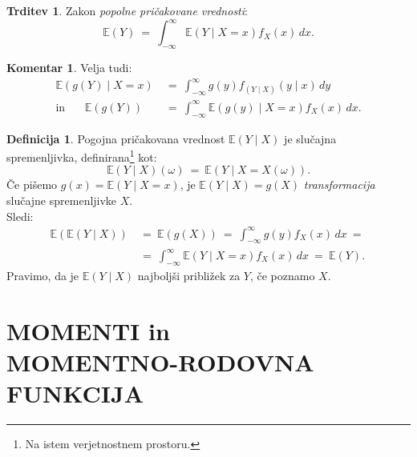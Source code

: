 \documentclass[11pt]{article}
\newcommand{\E}{\mathbb{E}}
\newcommand{\1}{\mathbbm{1}}
\theoremstyle{definition}
\newtheorem{definicija}{Definicija}[section]
\theoremstyle{definition}
\newtheorem{trditev}{Trditev}[section]
\theoremstyle{definition}
\newtheorem*{komentar}{Komentar}
\begin{document}
\begin{trditev}

Zakon \textit{popolne pričakovane vrednosti}:
$$\E(Y) ~=~ \int_{-\infty}^\infty \E(Y \mid X=x) f_X(x)\,dx.$$

\end{trditev}
\vspace{0.5cm}

\begin{komentar}

Velja tudi:
\begin{align*}
\E(g(Y) \mid X=x) ~&=~ \int_{-\infty}^\infty g(y) f_{(Y \mid X)}(y \mid x)\,dy \\
\text{in}~~~~~~~~\E(g(Y)) ~&=~ \int_{-\infty}^\infty \E(g(y) \mid X=x) f_X(x)\,dx.
\end{align*}

\end{komentar}
\vspace{0.5cm}

\begin{definicija}

Pogojna pričakovana vrednost $\E(Y \mid X)$ je slučajna spremenljivka, definirana\footnote{Na istem verjetnostnem prostoru.} kot:
$$\E(Y \mid X)(\omega) ~=~ \E(Y \mid X = X(\omega)).$$
Če pišemo $g(x) = \E(Y \mid X=x)$, je $\E(Y \mid X) = g(X)$ \textit{transformacija} slučajne spremenljivke $X$. \\

Sledi:
\begin{align*}
\E(\E(Y \mid X)) ~&=~ \E(g(X)) ~=~ \int_{-\infty}^\infty g(y) f_X(x)\,dx ~=~ \\
~&=~ \int_{-\infty}^\infty \E(Y \mid X=x) f_X(x)\,dx ~=~ \E(Y).
\end{align*}
Pravimo, da je $\E(Y \mid X)$ najboljši približek za $Y$, če poznamo $X$.

\end{definicija}
\vspace{0.5cm}

\pagebreak


\section{MOMENTI in \\MOMENTNO-RODOVNA FUNKCIJA}
\vspace{0.5cm}
\end{document}
